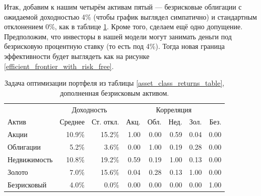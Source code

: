 Итак, добавим к нашим четырём активам пятый --- безрисковые облигации с 
ожидаемой доходностью 4\% (чтобы график выглядел симпатично) и стандартным 
отклонением 0\%, как в таблице \ref{asset_class_returns_table_with_risk_free}. 
Кроме того, сделаем ещё одно допущение. Предположим, что инвесторы в нашей 
модели могут занимать деньги под безрисковую процентную ставку (то есть под
4\%). Тогда новая граница эффективности будет выглядеть как на рисунке 
\ref{efficient_frontier_with_risk_free}.

\begin{table}[h]
\centering
\begin{tabular}{l|r|r|r|r|r|r|r}
 & \multicolumn{2}{c|}{Доходность} & \multicolumn{5}{c}{Корреляция} \\ 
\cline{2-8}
Актив        & Среднее & Ст. откл. & Акц. & Обл. & Нед. & Зол. & Без. \\ \hline
Акции        & 10.9\%  & 15.2\%    & 1.00 & 0.00 & 0.59 & 0.04 & 0.00 \\
Облигации    & 5.2\%   & 3.6\%     & 0.00 & 1.00 & 0.19 & 0.28 & 0.00 \\
Недвижимость & 10.8\%  & 19.2\%    & 0.59 & 0.19 & 1.00 & 0.13 & 0.00 \\
Золото       & 7.0\%   & 15.6\%    & 0.04 & 0.28 & 0.13 & 1.00 & 0.00 \\
Безрисковый  & 4.0\%   & 0.0\%     & 0.00 & 0.00 & 0.00 & 0.00 & 1.00
\end{tabular}
\caption{Задача оптимизации портфеля из таблицы \ref{asset_class_returns_table}, 
дополненная безрисковым активом.}
\label{asset_class_returns_table_with_risk_free}
\end{table}

